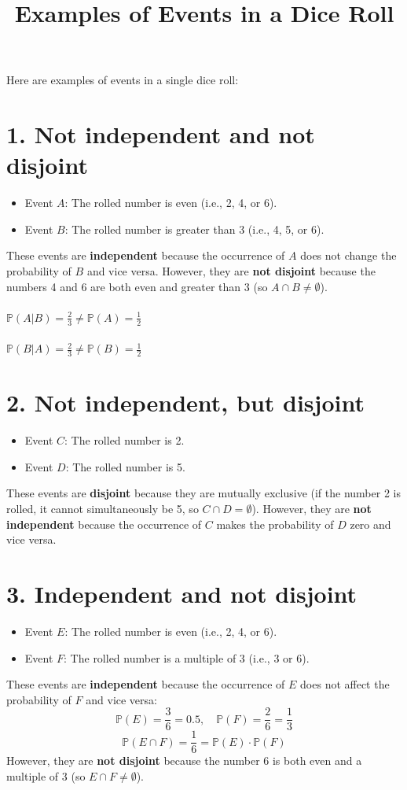 \documentclass{article}
\title{Examples of Events in a Dice Roll}
\author{}
\date{}
\begin{document}
\maketitle

Here are examples of events in a single dice roll:

\section*{1. Not independent and not disjoint}
\begin{itemize}
    \item Event $A$: The rolled number is even (i.e., 2, 4, or 6).
    \item Event $B$: The rolled number is greater than 3 (i.e., 4, 5, or 6).
\end{itemize}
These events are \textbf{independent} because the occurrence of $A$ does not change the probability of $B$ and vice versa. However, they are \textbf{not disjoint} because the numbers 4 and 6 are both even and greater than 3 (so $A \cap B \neq \emptyset$).\\
\\
$\mathbb{P}(A|B) = \frac{2}{3} \ne \mathbb{P}(A) = \frac{1}{2}$\\
\\
$\mathbb{P}(B|A) = \frac{2}{3} \ne \mathbb{P}(B) = \frac{1}{2}$

\section*{2. Not independent, but disjoint}
\begin{itemize}
    \item Event $C$: The rolled number is 2.
    \item Event $D$: The rolled number is 5.
\end{itemize}
These events are \textbf{disjoint} because they are mutually exclusive (if the number 2 is rolled, it cannot simultaneously be 5, so $C \cap D = \emptyset$). However, they are \textbf{not independent} because the occurrence of $C$ makes the probability of $D$ zero and vice versa.

\section*{3. Independent and not disjoint}
\begin{itemize}
    \item Event $E$: The rolled number is even (i.e., 2, 4, or 6).
    \item Event $F$: The rolled number is a multiple of 3 (i.e., 3 or 6).
\end{itemize}
These events are \textbf{independent} because the occurrence of $E$ does not affect the probability of $F$ and vice versa:
\[
\mathbb{P}(E) = \frac{3}{6} = 0.5, \quad \mathbb{P}(F) = \frac{2}{6} = \frac{1}{3}
\]
\[
\mathbb{P}(E \cap F) = \frac{1}{6} = \mathbb{P}(E) \cdot \mathbb{P}(F)
\]
However, they are \textbf{not disjoint} because the number 6 is both even and a multiple of 3 (so $E \cap F \neq \emptyset$).
\end{document}
